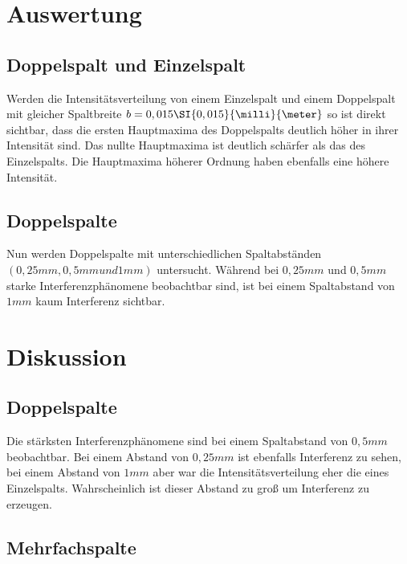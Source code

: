 \section{Auswertung}
\subsection{Doppelspalt und Einzelspalt}
Werden die Intensitätsverteilung von einem Einzelspalt und einem Doppelspalt mit gleicher Spaltbreite $ b= 0,015\SI{0,015}{\milli}{\meter} $ so ist direkt sichtbar, dass die ersten Hauptmaxima des Doppelspalts deutlich höher in ihrer Intensität sind. Das nullte Hauptmaxima ist deutlich schärfer als das des Einzelspalts. Die Hauptmaxima höherer Ordnung haben ebenfalls eine höhere Intensität.
\subsection{Doppelspalte}
Nun werden Doppelspalte mit unterschiedlichen Spaltabständen $ ( 0,25mm,0,5mm und 1mm) $ untersucht.
Während bei $ 0,25mm $ und $ 0,5mm $ starke Interferenzphänomene beobachtbar sind, ist bei einem Spaltabstand von $ 1mm $ kaum Interferenz sichtbar.
\section{Diskussion}
\subsection{Doppelspalte}
Die stärksten Interferenzphänomene sind bei einem Spaltabstand von $ 0,5mm $ beobachtbar. Bei einem Abstand von $ 0,25mm $ ist ebenfalls Interferenz zu sehen, bei einem Abstand von $ 1mm $ aber war die Intensitätsverteilung eher die eines Einzelspalts. Wahrscheinlich ist dieser Abstand zu groß um Interferenz zu erzeugen.
\subsection{Mehrfachspalte}
